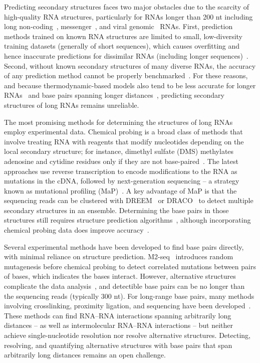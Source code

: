 \documentclass[main.tex]{subfiles}
\begin{document}
Predicting secondary structures faces two major obstacles due to the scarcity of high-quality RNA structures, particularly for RNAs longer than 200 nt including long non-coding~\cite{Quinn2016}, messenger~\cite{Lange2012}, and viral genomic~\cite{Nicholson2015} RNAs.
First, prediction methods trained on known RNA structures are limited to small, low-diversity training datasets (generally of short sequences), which causes overfitting and hence inaccurate predictions for dissimilar RNAs (including longer sequences)~\cite{Flamm2022,Sato2023}.
Second, without known secondary structures of many diverse RNAs, the accuracy of any prediction method cannot be properly benchmarked~\cite{Lange2012,Mathews2019}.
For these reasons, and because thermodynamic-based models also tend to be less accurate for longer RNAs~\cite{Nicholson2015} and base pairs spanning longer distances~\cite{Doshi2004}, predicting secondary structures of long RNAs remains unreliable.

The most promising methods for determining the structures of long RNAs employ experimental data.
Chemical probing is a broad class of methods that involve treating RNA with reagents that modify nucleotides depending on the local secondary structure; for instance, dimethyl sulfate (DMS) methylates adenosine and cytidine residues only if they are not base-paired~\cite{Kubota2015}.
The latest approaches use reverse transcription to encode modifications to the RNA as mutations in the cDNA, followed by next-generation sequencing -- a strategy known as mutational profiling (MaP)~\cite{Siegfried2014,Zubradt2016}.
A key advantage of MaP is that the sequencing reads can be clustered with DREEM~\cite{Tomezsko2020} or DRACO~\cite{Morandi2021} to detect multiple secondary structures in an ensemble.
Determining the base pairs in those structures still requires structure prediction algorithms~\cite{Mathews2004a}, although incorporating chemical probing data does improve accuracy~\cite{Cordero2012,Sloma2015}.

Several experimental methods have been developed to find base pairs directly, with minimal reliance on structure prediction.
M2-seq~\cite{Cheng2017} introduces random mutagenesis before chemical probing to detect correlated mutations between pairs of bases, which indicates the bases interact.
However, alternative structures complicate the data analysis~\cite{Cordero2015}, and detectible base pairs can be no longer than the sequencing reads (typically 300 nt).
For long-range base pairs, many methods involving crosslinking, proximity ligation, and sequencing have been developed~\cite{Kudla2020}.
These methods can find RNA--RNA interactions spanning arbitrarily long distances -- as well as intermolecular RNA--RNA interactions -- but neither achieve single-nucleotide resolution nor resolve alternative structures.
Detecting, resolving, and quantifying alternative structures with base pairs that span arbitrarily long distances remains an open challenge.
\end{document}
